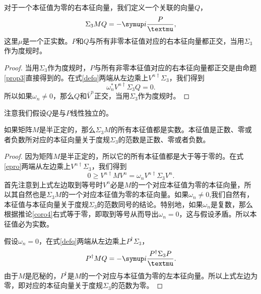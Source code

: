 \begin{proposition}
    对于一个本征值为零的右本征向量，我们定义一个关联的向量$Q$，
    \begin{equation}
  \Sigma_3 M Q = -\iu \frac{P}{\mu},\label{defq}
\end{equation}
这里$\mu$是一个正实数。$P$和$Q$与所有非零本征值对应的右本征向量都正交，当用$\Sigma_3$作为度规时。
\end{proposition}

\begin{proof}
    当用$\Sigma_3$作为度规时，$P$与所有非零本征值对应的右本征向量都正交是由命题\ref{prop3}直接得到的。在式\eqref{defq}两端从左边乘上$V^{n\dagger} \Sigma_3$，我们得到
    \begin{equation}
  \omega^*_n V^{n\dagger} \Sigma_3 Q= 0.
\end{equation}
所以如果$\omega_n\neq 0$，那么$Q$和$\bar V^n$正交，当用$\Sigma_3$作为度规时。
\end{proof}

注意我们假设$Q$是与$P$线性独立的。

\begin{proposition}\label{prop6}
    如果矩阵$M$是半正定的，那么$\Sigma_3 M$的所有本征值都是实数。本征值是正数、零或者负数所对应的本征向量关于度规$\Sigma_3$的范数是正数、零或者负数。
\end{proposition}

\begin{proof}
    因为矩阵$M$是半正定的，所以它的所有本征值都是大于等于零的。在式\eqref{epro}两端从左边乘上$V^{n\dagger}\Sigma_3$，我们得到
    \begin{equation}
  0\ge V^{n\dagger} M V^n = \omega_n V^{n \dagger} \Sigma_3 V^n.
\end{equation}
首先注意到上式左边取到等号时$V^n$必是$M$的一个对应本征值为零的本征向量，所以其自然也是$\Sigma_3 M$的一个对应本征值为零的本征向量。如果$\omega_n\neq 0$,我们自然有，本征值与本征向量关于度规$\Sigma_3$的范数同号的结论。特别地，如果$\omega_n$是复数，那么根据推论\ref{coro4}右式等于零，即取到等号从而导出$\omega_n=0$，这与假设矛盾。所以本征值必为实数。

假设$\omega_n=0$，在式\eqref{defq}两端从左边乘上$P^\dagger \Sigma_3$，
\begin{equation}
  P^\dagger M Q = -\iu \frac{P^\dagger \Sigma_3 P}{\mu}.
\end{equation}
由于$M$是厄秘的，$P^\dagger$是$M$的一个对应与本征值为零的左本征向量。所以上式左边为零，即对应的本征向量关于度规$\Sigma_3$的范数为零。

\end{proof}

